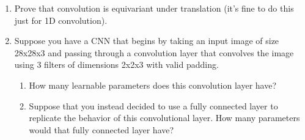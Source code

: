 \documentclass{article}
\begin{document}
\begin{enumerate}
\item Prove that convolution is equivariant under translation (it’s fine to do this just for 1D convolution).

\item Suppose you have a CNN that begins by taking an input image of size 28x28x3 and passing through a convolution layer that convolves the image using 3 filters of dimensions 2x2x3 with valid padding.
\begin{enumerate}
    \item How many learnable parameters does this convolution layer have?
    \item Suppose that you instead decided to use a fully connected layer to replicate the behavior of this convolutional layer. How many parameters would that fully connected layer have?
\end{enumerate}


    
\end{enumerate}
\end{document}
